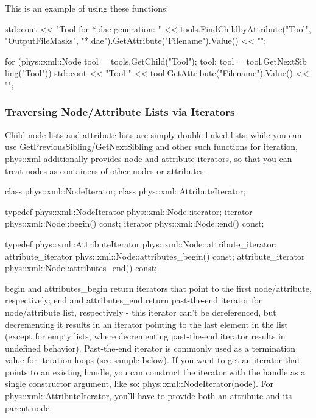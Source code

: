 This is an example of using these functions: 
\begin{DoxyCode}
 std::cout << "Tool for *.dae generation: " << tools.FindChildbyAttribute("Tool",
       "OutputFileMasks", "*.dae").GetAttribute("Filename").Value() << "\n";

 for (phys::xml::Node tool = tools.GetChild("Tool"); tool; tool = tool.GetNextSib
      ling("Tool"))
 {
     std::cout << "Tool " << tool.GetAttribute("Filename").Value() << "\n";
 }
\end{DoxyCode}
 \hypertarget{XMLManual_XMLAccessingIterators}{}\subsubsection{Traversing Node/Attribute Lists via Iterators}\label{XMLManual_XMLAccessingIterators}
Child node lists and attribute lists are simply double-\/linked lists; while you can use GetPreviousSibling/GetNextSibling and other such functions for iteration, \hyperlink{namespacephys_1_1xml}{phys::xml} additionally provides node and attribute iterators, so that you can treat nodes as containers of other nodes or attributes: 
\begin{DoxyCode}
 class phys::xml::NodeIterator;
 class phys::xml::AttributeIterator;

 typedef phys::xml::NodeIterator phys::xml::Node::iterator;
 iterator phys::xml::Node::begin() const;
 iterator phys::xml::Node::end() const;

 typedef phys::xml::AttributeIterator phys::xml::Node::attribute_iterator;
 attribute_iterator phys::xml::Node::attributes_begin() const;
 attribute_iterator phys::xml::Node::attributes_end() const;
\end{DoxyCode}
 begin and attributes\_\-begin return iterators that point to the first node/attribute, respectively; end and attributes\_\-end return past-\/the-\/end iterator for node/attribute list, respectively -\/ this iterator can't be dereferenced, but decrementing it results in an iterator pointing to the last element in the list (except for empty lists, where decrementing past-\/the-\/end iterator results in undefined behavior). Past-\/the-\/end iterator is commonly used as a termination value for iteration loops (see sample below). If you want to get an iterator that points to an existing handle, you can construct the iterator with the handle as a single constructor argument, like so: phys::xml::NodeIterator(node). For \hyperlink{classphys_1_1xml_1_1AttributeIterator}{phys::xml::AttributeIterator}, you'll have to provide both an attribute and its parent node. \par

